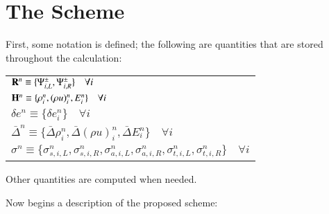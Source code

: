 \section{The Scheme}

First, some notation is defined; the following are quantities that are stored
throughout the calculation:
\begin{center}
\begin{tabular}{l}
   $\mathbf{R}^n \equiv \{\Psi^\pm_{i,L},\Psi^\pm_{i,R}\} \quad\forall i$ \\
   $\mathbf{H}^n \equiv \{\rho_i^n, (\rho u)_i^n, E_i^n\} \quad\forall i$ \\
   $\delta e^n \equiv \{\delta e_i^n\} \quad\forall i$ \\
   $\bar{\Delta}^n \equiv \{\bar{\Delta}\rho_i^n, \bar{\Delta}(\rho u)_i^n,
     \bar{\Delta} E_i^n\} \quad\forall i$ \\
   $\sigma^n \equiv \{\sigma_{s,i,L}^n, \sigma_{s,i,R}^n,
   \sigma_{a,i,L}^n, \sigma_{a,i,R}^n, \sigma_{t,i,L}^n, \sigma_{t,i,R}^n\}
   \quad\forall i$
\end{tabular}
\end{center}
Other quantities are computed when needed.

Now begins a description of the proposed scheme:

